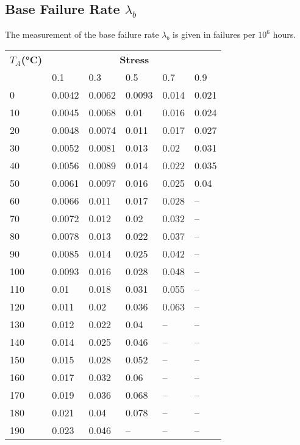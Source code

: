 \subsection{Base Failure Rate $\lambda_b$}
The measurement of the base failure rate $\lambda_b$ is given in failures per $10^6$ hours.
\begin{table}[ht]
{\centering

\begin{tabular}{|p{1.1cm}|*{5}{p{1.1cm}|}}
    \hline
    \textbf{$T_A$(°C)} & \multicolumn{5}{c|}{\textbf{Stress}} \\
    & 0.1 & 0.3 & 0.5 & 0.7 & 0.9 \\
    \hline
    0 & 0.0042 & 0.0062 & 0.0093 & 0.014 & 0.021 \\
    \hline
    10 & 0.0045 & 0.0068 & 0.01 & 0.016 & 0.024 \\
    \hline
    20 & 0.0048 & 0.0074 & 0.011 & 0.017 & 0.027 \\
    \hline
    30 & 0.0052 & 0.0081 & 0.013 & 0.02 & 0.031 \\
    \hline
    40 & 0.0056 & 0.0089 & 0.014 & 0.022 & 0.035 \\
    \hline
    50 & 0.0061 & 0.0097 & 0.016 & 0.025 & 0.04 \\
    \hline
    60 & 0.0066 & 0.011 & 0.017 & 0.028 & -- \\
    \hline
    70 & 0.0072 & 0.012 & 0.02 & 0.032 & -- \\
    \hline
    80 & 0.0078 & 0.013 & 0.022 & 0.037 & -- \\
    \hline
    90 & 0.0085 & 0.014 & 0.025 & 0.042 & -- \\
    \hline
    100 & 0.0093 & 0.016 & 0.028 & 0.048 & -- \\
    \hline
    110 & 0.01 & 0.018 & 0.031 & 0.055 & -- \\
    \hline
    120 & 0.011 & 0.02 & 0.036 & 0.063 & -- \\
    \hline
    130 & 0.012 & 0.022 & 0.04 & -- & -- \\
    \hline
    140 & 0.014 & 0.025 & 0.046 & -- & -- \\
    \hline
    150 & 0.015 & 0.028 & 0.052 & -- & -- \\
    \hline
    160 & 0.017 & 0.032 & 0.06 & -- & -- \\
    \hline
    170 & 0.019 & 0.036 & 0.068 & -- & -- \\
    \hline
    180 & 0.021 & 0.04 & 0.078 & -- & -- \\
    \hline
    190 & 0.023 & 0.046 & -- & -- & -- \\

\end{tabular}}
\end{table}
